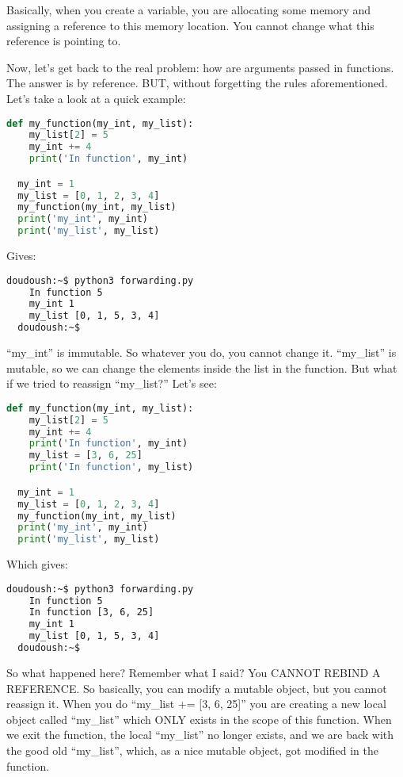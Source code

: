 Basically, when you create a variable, you are allocating some memory and assigning a reference
to this memory location. You cannot change what this reference is pointing to.

\vspace{5mm}
Now, let's get back to the real problem: how are arguments passed in functions. The answer is by reference.
BUT, without forgetting the rules aforementioned. Let's take a look at a quick example:

\begin{lstlisting}[language=python]
  def my_function(my_int, my_list):
    my_list[2] = 5
    my_int += 4
    print('In function', my_int)

  my_int = 1
  my_list = [0, 1, 2, 3, 4]
  my_function(my_int, my_list)
  print('my_int', my_int)
  print('my_list', my_list)
\end{lstlisting}

Gives:

\begin{lstlisting}[language=bash]
  doudoush:~$ python3 forwarding.py
    In function 5
    my_int 1
    my_list [0, 1, 5, 3, 4]
  doudoush:~$
\end{lstlisting}

``my\_int'' is immutable. So whatever you do, you cannot change it. ``my\_list'' is mutable,
so we can change the elements inside the list in the function. But what if we tried to
reassign ``my\_list?'' Let's see:

\begin{lstlisting}[language=python]
  def my_function(my_int, my_list):
    my_list[2] = 5
    my_int += 4
    print('In function', my_int)
    my_list = [3, 6, 25]
    print('In function', my_list)

  my_int = 1
  my_list = [0, 1, 2, 3, 4]
  my_function(my_int, my_list)
  print('my_int', my_int)
  print('my_list', my_list)
\end{lstlisting}

Which gives:

\begin{lstlisting}[language=bash]
  doudoush:~$ python3 forwarding.py
    In function 5
    In function [3, 6, 25]
    my_int 1
    my_list [0, 1, 5, 3, 4]
  doudoush:~$
\end{lstlisting}

So what happened here? Remember what I said? You CANNOT REBIND A REFERENCE.
So basically, you can modify a mutable object, but you cannot reassign it.
When you do ``my\_list += [3, 6, 25]'' you are creating a new local object called ``my\_list''
which ONLY exists in the scope of this function. When we exit the function, the local ``my\_list''
no longer exists, and we are back with the good old ``my\_list'', which, as a nice mutable
object, got modified in the function.

